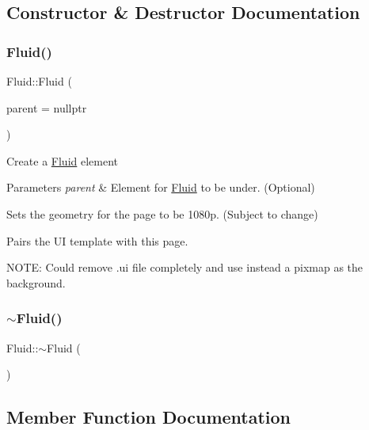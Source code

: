 \subsection{Constructor \& Destructor Documentation}
\mbox{\label{classFluid_af73b49dddf652b62f3cb78e400c09446}} 
\subsubsection{\texorpdfstring{Fluid()}{Fluid()}}
{\footnotesize\ttfamily Fluid\+::\+Fluid (\begin{DoxyParamCaption}\item[{Q\+Widget $\ast$}]{parent = {\ttfamily nullptr} }\end{DoxyParamCaption})\hspace{0.3cm}{\ttfamily [explicit]}}

Create a \mbox{\hyperlink{classFluid}{Fluid}} element 
\begin{DoxyParams}{Parameters}
{\em parent} & Element for \mbox{\hyperlink{classFluid}{Fluid}} to be under. (Optional)\\
\hline
\end{DoxyParams}
Sets the geometry for the page to be 1080p. (Subject to change)

Pairs the UI template with this page.

N\+O\+TE\+: Could remove .ui file completely and use instead a pixmap as the background. \mbox{\label{classFluid_af461f45faf49d13c195739a57ab7814a}} 
\subsubsection{\texorpdfstring{$\sim$Fluid()}{~Fluid()}}
{\footnotesize\ttfamily Fluid\+::$\sim$\+Fluid (\begin{DoxyParamCaption}{ }\end{DoxyParamCaption})}



\subsection{Member Function Documentation}
\mbox{\label{classFluid_a92695db4868e8b2ec1bf4649ce5a9d19}} 
